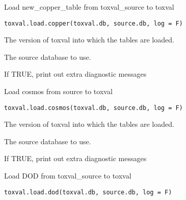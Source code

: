 \documentclass[letterpaper]{book}
\begin{document}
%
\begin{Description}\relax
Load new\_copper\_table from toxval\_source to toxval
\end{Description}
%
\begin{Usage}
\begin{verbatim}
toxval.load.copper(toxval.db, source.db, log = F)
\end{verbatim}
\end{Usage}
%
\begin{Arguments}
\begin{ldescription}
\item[\code{toxval.db}] The version of toxval into which the tables are loaded.

\item[\code{source.db}] The source database to use.

\item[\code{verbose}] If TRUE, print out extra diagnostic messages
\end{ldescription}
\end{Arguments}
%
\begin{Description}\relax
Load cosmos from source to toxval
\end{Description}
%
\begin{Usage}
\begin{verbatim}
toxval.load.cosmos(toxval.db, source.db, log = F)
\end{verbatim}
\end{Usage}
%
\begin{Arguments}
\begin{ldescription}
\item[\code{toxval.db}] The version of toxval into which the tables are loaded.

\item[\code{source.db}] The source database to use.

\item[\code{verbose}] If TRUE, print out extra diagnostic messages
\end{ldescription}
\end{Arguments}
%
\begin{Description}\relax
Load DOD from toxval\_source to toxval
\end{Description}
%
\begin{Usage}
\begin{verbatim}
toxval.load.dod(toxval.db, source.db, log = F)
\end{verbatim}
\end{Usage}
\end{document}
